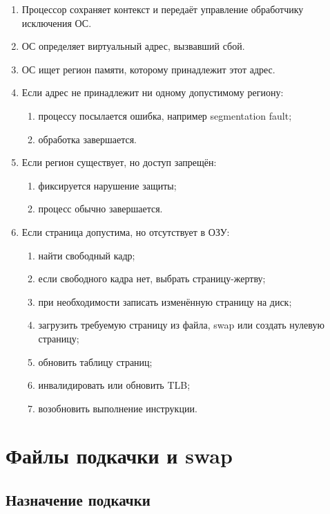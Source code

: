 \documentclass[a4paper,12pt]{article}
\begin{document}
\begin{enumerate}
    \item Процессор сохраняет контекст и передаёт управление обработчику исключения ОС.
    \item ОС определяет виртуальный адрес, вызвавший сбой.
    \item ОС ищет регион памяти, которому принадлежит этот адрес.
    \item Если адрес не принадлежит ни одному допустимому региону:
    \begin{enumerate}
        \item процессу посылается ошибка, например segmentation fault;
        \item обработка завершается.
    \end{enumerate}
    \item Если регион существует, но доступ запрещён:
    \begin{enumerate}
        \item фиксируется нарушение защиты;
        \item процесс обычно завершается.
    \end{enumerate}
    \item Если страница допустима, но отсутствует в ОЗУ:
    \begin{enumerate}
        \item найти свободный кадр;
        \item если свободного кадра нет, выбрать страницу-жертву;
        \item при необходимости записать изменённую страницу на диск;
        \item загрузить требуемую страницу из файла, swap или создать нулевую страницу;
        \item обновить таблицу страниц;
        \item инвалидировать или обновить TLB;
        \item возобновить выполнение инструкции.
    \end{enumerate}
\end{enumerate}

\section{Файлы подкачки и swap}

\subsection{Назначение подкачки}
\end{document}

